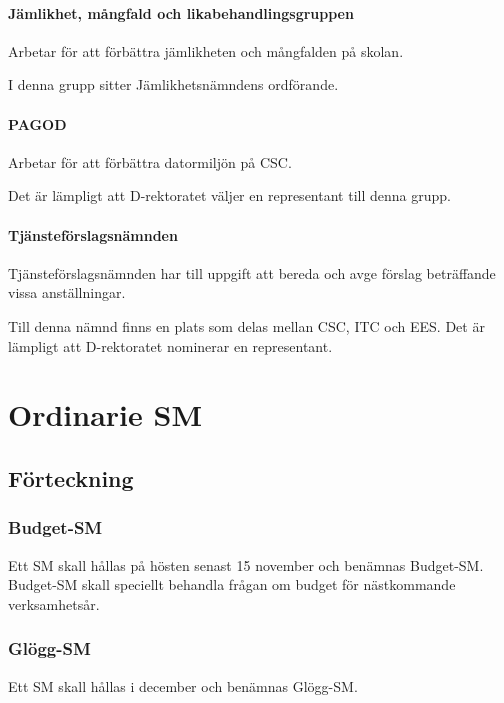 \documentclass{dgovdoc}
\begin{document}
\paragraph{Jämlikhet, mångfald och likabehandlingsgruppen}

Arbetar för att förbättra jämlikheten och mångfalden på skolan.

I denna grupp sitter Jämlikhetsnämndens ordförande.

\paragraph{PAGOD}

Arbetar för att förbättra datormiljön på CSC.

Det är lämpligt att D-rektoratet väljer en representant till denna grupp.

\paragraph{Tjänsteförslagsnämnden}

Tjänsteförslagsnämnden har till uppgift att bereda och avge förslag beträffande
vissa anställningar.

Till denna nämnd finns en plats som delas mellan CSC, ITC och EES. Det är
lämpligt att D-rektoratet nominerar en representant.

\section{Ordinarie SM}

\subsection{Förteckning}

\subsubsection{Budget-SM}

Ett SM skall hållas på hösten senast 15 november och benämnas Budget-SM.
Budget-SM skall speciellt behandla frågan om budget för nästkommande
verksamhetsår.

\subsubsection{Glögg-SM}

Ett SM skall hållas i december och benämnas Glögg-SM.
\end{document}
